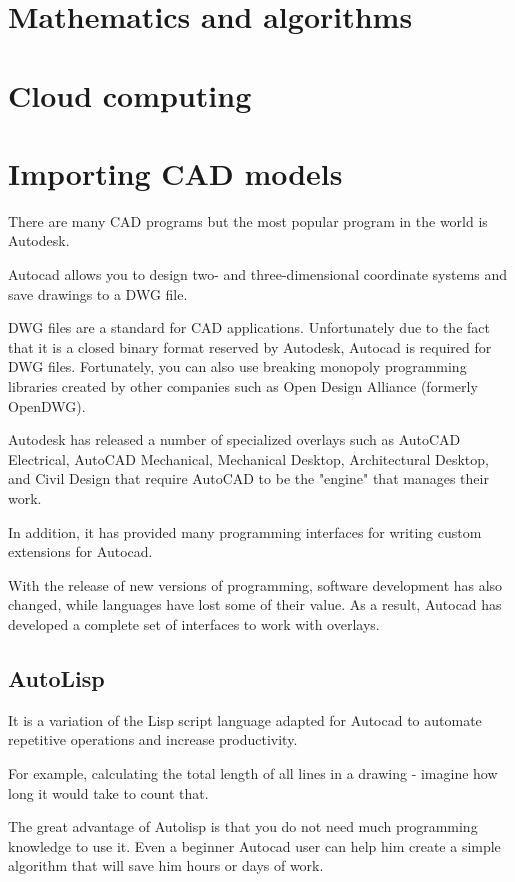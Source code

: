 \documentclass[a4paper, 11pt, article]{report}
\begin{document}
\section{Mathematics and algorithms}

\section{Cloud computing}

\section{Importing CAD models}
   
There are many CAD programs but the most popular program in the world is Autodesk. 

Autocad allows you to design two- and three-dimensional coordinate systems and save drawings to a DWG file.

DWG files are a standard for CAD applications. Unfortunately due to the fact that it is a closed binary format reserved by Autodesk, Autocad is required for DWG files. Fortunately, you can also use breaking monopoly programming libraries created by other companies such as Open Design Alliance (formerly OpenDWG).

Autodesk has released a number of specialized overlays such as AutoCAD Electrical, AutoCAD Mechanical, Mechanical Desktop, Architectural Desktop, and Civil Design that require AutoCAD to be the "engine" that manages their work.

In addition, it has provided many programming interfaces for writing custom extensions for Autocad.

With the release of new versions of programming, software development has also changed, while languages have lost some of their value. As a result, Autocad has developed a complete set of interfaces to work with overlays.

\subsection{AutoLisp}

It is a variation of the Lisp script language adapted for Autocad to automate repetitive operations and increase productivity.

For example, calculating the total length of all lines in a drawing - imagine how long it would take to count that.

The great advantage of Autolisp is that you do not need much programming knowledge to use it. Even a beginner Autocad user can help him create a simple algorithm that will save him hours or days of work.
\end{document}
